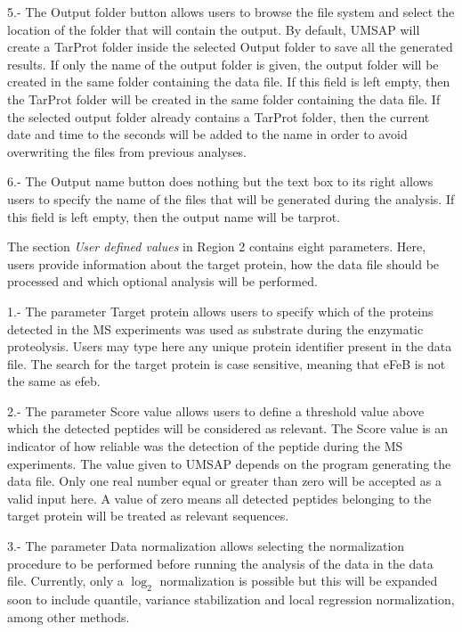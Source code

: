 \num{5}.- The Output folder\label{par:enzdigOutF} button allows users to browse the file system and select the location of the folder that will contain the output. By default, UMSAP will create a TarProt folder inside the selected Output folder to save all the generated results. If only the name of the output folder is given, the output folder will be created in the same folder containing the data file. If this field is left empty, then the TarProt folder will be created in the same folder containing the data file. If the selected output folder already contains a TarProt folder, then the current date and time to the seconds will be added to the name in order to avoid overwriting the files from previous analyses.

\num{6}.- The Output name button does nothing but the text box to its right allows users to specify the name of the files that will be generated during the analysis. If this field is left empty, then the output name will be tarprot. 

The section \textit{User defined values} in Region \num{2} contains eight parameters. Here, users provide information about the target protein, how the data file should be processed and which optional analysis will be performed.

\num{1}.- The parameter Target protein\label{par:subsprot} allows users to specify which of the proteins detected in the MS experiments was used as substrate during the enzymatic proteolysis. Users may type here any unique protein identifier present in the data file. The search for the target protein is case sensitive, meaning that eFeB is not the same as efeb.

\num{2}.- The parameter Score value\label{par:scorevalueenzdig} allows users to define a threshold value above which the detected peptides will be considered as relevant. The Score value is an indicator of how reliable was the detection of the peptide during the MS experiments. The value given to UMSAP depends on the program generating the data file. Only one real number equal or greater than zero will be accepted as a valid input here. A value of zero means all detected peptides belonging to the target protein will be treated as relevant sequences.

\num{3}.- The parameter Data normalization allows selecting the normalization procedure to be performed before running the analysis of the data in the data file. Currently, only a $\log_2$ normalization is possible but this will be expanded soon to include quantile, variance stabilization and local regression normalization, among other methods. 

